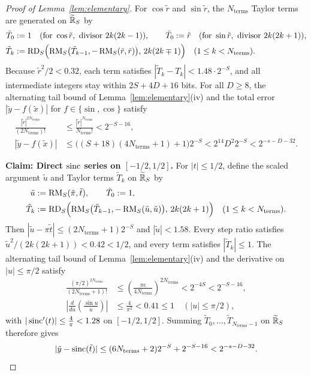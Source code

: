 \begin{proof}[Proof of Lemma~\ref{lem:elementary}]
For $\cos\tilde{r}$ and $\sin\tilde{r}$, the $N_{\mathrm{terms}}$ Taylor terms are generated on $\widetilde{\mathbb{R}}_S$ by
\begin{align*}
  \tilde{T}_0 &:= 1 \quad (\text{for }\cos\tilde{r},\text{ divisor }2k(2k-1)), \qquad
  \tilde{T}_0 := \tilde{r} \quad (\text{for }\sin\tilde{r},\text{ divisor }2k(2k+1)), \\
  \tilde{T}_k &:= \operatorname{RD}_S\Bigl(\operatorname{RM}_S\bigl(\tilde{T}_{k-1}, -\operatorname{RM}_S(\tilde{r}, \tilde{r})\bigr),\, 2k(2k \mp 1)\Bigr) \quad (1 \le k < N_{\mathrm{terms}}).
\end{align*}
Because $\tilde{r}^2 / 2 < 0.32$, each term satisfies $|\tilde{T}_k - T_k| < 1.48 \cdot 2^{-S}$, and all intermediate integers stay within $2S + 4D + 16$ bits. For all $D \ge 8$, the alternating tail bound of Lemma~\ref{lem:elementary}(iv) and the total error $|\tilde{y} - f(\tilde{x})|$ for $f \in \{\sin, \cos\}$ satisfy
\begin{align*}
  \frac{|\tilde{r}|^{2N_{\mathrm{terms}}}}{(2N_{\mathrm{terms}})!} &\le \frac{|\tilde{r}|^{N_{\mathrm{terms}}}}{N_{\mathrm{terms}}!} < 2^{-S-16}, \\
  |\tilde{y} - f(\tilde{x})| &\le \bigl((S + 18)(4 N_{\mathrm{terms}} + 1) + 1\bigr) 2^{-S} < 2^{14} D^2 2^{-S} < 2^{-s-D-32}.
\end{align*}

\textbf{Claim: Direct $\operatorname{sinc}$ series on $[-1/2, 1/2]$.}
For $|t| \le 1/2$, define the scaled argument $\tilde{u}$ and Taylor terms $\tilde{T}_k$ on $\widetilde{\mathbb{R}}_S$ by
\begin{align*}
  \tilde{u} &:= \operatorname{RM}_S(\tilde{\pi}, \tilde{t}), \qquad \tilde{T}_0 := 1, \\
  \tilde{T}_k &:= \operatorname{RD}_S\Bigl(\operatorname{RM}_S\bigl(\tilde{T}_{k-1}, -\operatorname{RM}_S(\tilde{u}, \tilde{u})\bigr),\, 2k(2k+1)\Bigr) \quad (1 \le k < N_{\mathrm{terms}}).
\end{align*}
Then $|\tilde{u} - \pi\tilde{t}| \le (2N_{\mathrm{terms}} + 1)2^{-S}$ and $|\tilde{u}| < 1.58$. Every step ratio satisfies $\tilde{u}^2 / (2k(2k+1)) < 0.42 < 1/2$, and every term satisfies $|\tilde{T}_k| \le 1$. The alternating tail bound of Lemma~\ref{lem:elementary}(iv) and the derivative on $|u| \le \pi/2$ satisfy
\begin{align*}
  \frac{(\pi/2)^{2N_{\mathrm{terms}}}}{(2N_{\mathrm{terms}}+1)!} &\le \left(\frac{\pi e}{4N_{\mathrm{terms}}}\right)^{2N_{\mathrm{terms}}} < 2^{-4S} < 2^{-S-16}, \\
  \left|\frac{d}{du}\!\left(\frac{\sin u}{u}\right)\right| &\le \frac{4}{\pi^2} < 0.41 \le 1 \quad (|u| \le \pi/2),
\end{align*}
with $|\operatorname{sinc}'(t)| \le \frac{4}{\pi} < 1.28$ on $[-1/2, 1/2]$. Summing $\tilde{T}_0, \dots, \tilde{T}_{N_{\mathrm{terms}}-1}$ on $\widetilde{\mathbb{R}}_S$ therefore gives
\[
  |\tilde{y} - \operatorname{sinc}(\tilde{t})| \le (6 N_{\mathrm{terms}} + 2) 2^{-S} + 2^{-S-16} < 2^{-s-D-32}.
\]


\end{proof}
